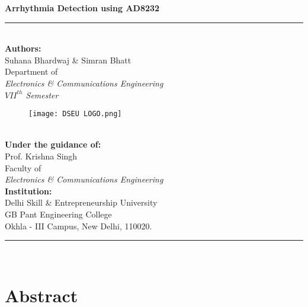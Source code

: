\documentclass[12pt,a4paper]{article}
\begin{document}
\begin{titlepage}
\newcommand{\HRule}{\rule{\linewidth}{0.8mm}}


\centering
\vspace*{0.5cm}


{\Huge\bfseries Arrhythmia Detection using AD8232\par}
\HRule \\[0.8cm]

{\Large\textbf{Authors:}} \\[0.3cm]
{\large Suhana Bhardwaj \& Simran Bhatt} \\
{\large Department of} \\
{\large \textit{Electronics \& Communications Engineering}} \\
{\large \textit{$VII^{th}$ Semester}} \\[1cm]
{\begin{figure}[h]
        \centering
        \texttt{[image: DSEU LOGO.png]}
\end{figure}} \\[1cm]
{\Large\textbf{Under the guidance of:}} \\[0.3cm]
{\large Prof. Krishna Singh} \\
{\large Faculty of} \\
{\large \textit{Electronics \& Communications Engineering}} \\[2cm]

{\Large\textbf{Institution:}} \\[0.3cm]
{\large Delhi Skill \& Entrepreneurship University} \\
{\large GB Pant Engineering College} \\
{\large Okhla - III Campus, New Delhi, 110020.} \\


\vfill
\HRule \\[0.3cm]
\end{titlepage}

\newpage
\tableofcontents

\section*{Abstract}
\end{document}
